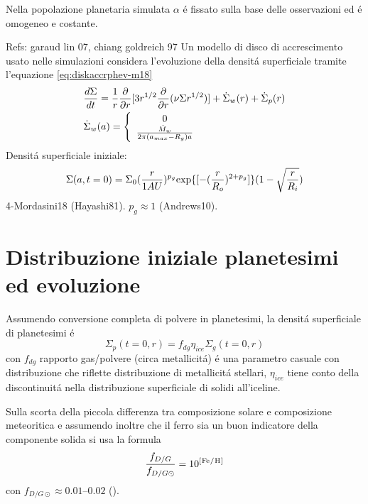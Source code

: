 \begin{workout}
Nella popolazione planetaria simulata $\alpha$ \'e fissato sulla base delle osservazioni  ed \'e omogeneo e costante.
\end{workout}

\begin{workout}
Refs: garaud lin 07, chiang goldreich 97
Un modello di disco  di accrescimento usato nelle simulazioni considera l'evoluzione della densit\'a superficiale tramite l'equazione \eqref{eq:diskaccrphev-m18}
\begin{align}
&\frac{d \Sigma}{d t}=\frac{1}{r}\frac{\partial}{\partial r}[3r^{1/2}\frac{\partial}{\partial r}(\nu\Sigma r^{1/2})]+\dot{\Sigma}_w(r)+\dot{\Sigma}_p(r)\label{eq:diskaccrphev-m18}\\
&\dot{\Sigma}_w(a)=\left\{\begin{array}{c}0\\\frac{\dot{M}_w}{2\pi(a_{max}-R_g)a}\\\end{array}\right.
\end{align}
Densit\'a superficiale iniziale:
\begin{equation}
\Sigma(a,t=0)=\Sigma_0(\frac{r}{1AU})^{p_g}\text{exp}\{[-(\frac{r}{R_o})^{2+p_g}]\}(1-\sqrt{\frac{r}{R_i}})
\end{equation}
4-Mordasini18 (Hayashi81). $p_g\approx1$ (Andrews10).
\end{workout}

\section{Distribuzione iniziale planetesimi ed evoluzione}

Assumendo conversione completa di polvere in planetesimi, la densit\'a superficiale di planetesimi \'e
\begin{equation}
\Sigma_p(t=0,r)=f_{dg}\eta_{ice}\Sigma_g(t=0,r)
\end{equation}
con $f_{dg}$ rapporto gas/polvere (circa metallicit\'a) \'e una parametro casuale con distribuzione che riflette distribuzione di metallicit\'a stellari, $\eta_{ice}$ tiene conto della discontinuit\'a nella distribuzione superficiale di solidi all'iceline.

Sulla scorta della piccola differenza tra composizione solare e composizione meteoritica e assumendo inoltre che il ferro sia un buon indicatore della componente solida  si usa la formula
\begin{equation}
\frac{f_{D/G}}{f_{D/G\odot}}=10\expy{[\cel{Fe}{}{}{}/\cel{H}{}{}{}]}
\end{equation}
con $f_{D/G\odot}\approx\numrange{0.01}{0.02}$ (\cite{lodders2003solar}).

